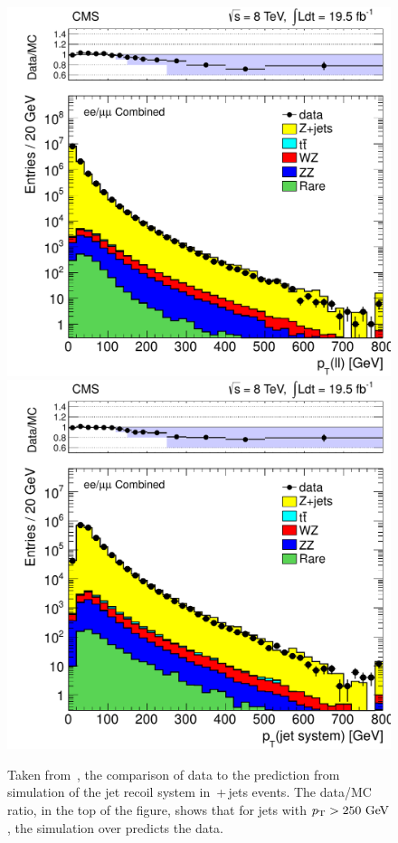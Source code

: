 \begin{figure}[ht!]
  \begin{center}
  \includegraphics[scale=0.35]{Figures/sus13009/ISRmodellingSUS13011_zjets1.pdf}
  \includegraphics[scale=0.35]{Figures/sus13009/ISRmodellingSUS13011_zjets2.pdf}  
  \caption{Taken from~\cite{CMSsinglelep}, the comparison of data to the prediction from simulation of the jet recoil system in \Z{}\,+\,jets events.  The data/MC ratio, in the top of the figure, shows that for jets with $p_{\text{T}}>250~\mathrm{GeV}$, the simulation over predicts the data. 
\label{fig:ISRsyst}}
  \end{center}
\end{figure}



